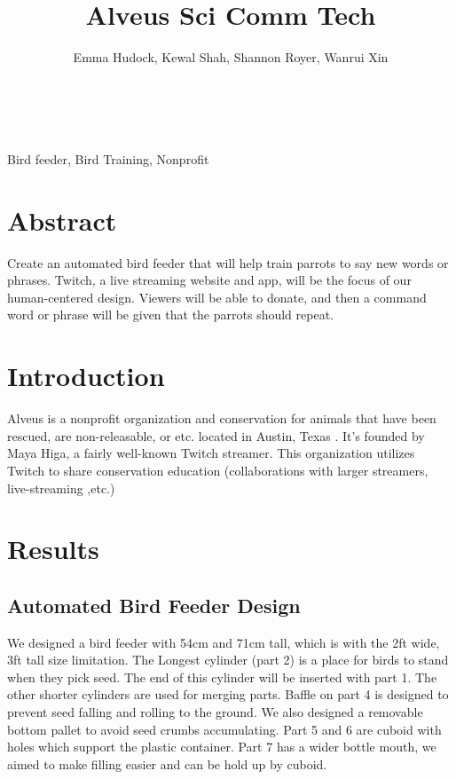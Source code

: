\documentclass[11pt]{article}
\title{\bf 
\vspace{-1in}
Alveus Sci Comm Tech}
\author{Emma Hudock, Kewal Shah, Shannon Royer, Wanrui Xin \\
\text{\small{Schools of Interactive Computing, Civil and Environmental Engineering, and Biological Sciences$^4$}}\\
\text{\small{Georgia Institute of Technology, Atlanta, GA 30332, USA}}}
\begin{document}
\maketitle 


 \\%
Bird feeder, Bird Training, Nonprofit

\section*{Abstract}
Create an automated bird feeder that will help train parrots to say new words or phrases. Twitch, a live streaming website and app, will be the focus of our human-centered design. Viewers will be able to donate, and then a command word or phrase will be given that the parrots should repeat.


\section{Introduction}
Alveus is a nonprofit organization and conservation for animals that have been rescued, are non-releasable, or etc. located in Austin, Texas
. It's founded by Maya Higa, a fairly well-known Twitch streamer. This organization utilizes Twitch to share conservation education (collaborations with larger streamers, live-streaming ,etc.)



\section{Results}
\subsection{Automated Bird Feeder Design}
We designed a bird feeder with 54cm and 71cm tall, which is with the 2ft wide, 3ft tall size limitation. The Longest cylinder (part 2) is a place for birds to stand when they pick seed. The end of this cylinder will be inserted with part 1. The other shorter cylinders are used for merging parts. Baffle on part 4 is designed to prevent seed falling and rolling to the ground. We also designed a removable bottom pallet to avoid seed crumbs accumulating. Part 5 and 6 are cuboid with holes which support the plastic container. Part 7 has a wider bottle mouth, we aimed to make filling easier and can be hold up by cuboid.
\end{document}

